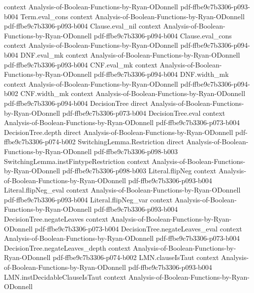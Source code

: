 \begin{lemma}
  {context}
  {Analysis-of-Boolean-Functions-by-Ryan-ODonnell}
  {pdf-ffbe9c7b3306-p093-b004}
\proofstep
  {Term.eval_cons}
  {context}
  {Analysis-of-Boolean-Functions-by-Ryan-ODonnell}
  {pdf-ffbe9c7b3306-p093-b004}
\proofstep
  {Clause.eval_nil}
  {context}
  {Analysis-of-Boolean-Functions-by-Ryan-ODonnell}
  {pdf-ffbe9c7b3306-p094-b004}
\proofstep
  {Clause.eval_cons}
  {context}
  {Analysis-of-Boolean-Functions-by-Ryan-ODonnell}
  {pdf-ffbe9c7b3306-p094-b004}
\proofstep
  {DNF.eval_mk}
  {context}
  {Analysis-of-Boolean-Functions-by-Ryan-ODonnell}
  {pdf-ffbe9c7b3306-p093-b004}
\proofstep
  {CNF.eval_mk}
  {context}
  {Analysis-of-Boolean-Functions-by-Ryan-ODonnell}
  {pdf-ffbe9c7b3306-p094-b004}
\proofstep
  {DNF.width_mk}
  {context}
  {Analysis-of-Boolean-Functions-by-Ryan-ODonnell}
  {pdf-ffbe9c7b3306-p094-b002}
\proofstep
  {CNF.width_mk}
  {context}
  {Analysis-of-Boolean-Functions-by-Ryan-ODonnell}
  {pdf-ffbe9c7b3306-p094-b004}
\proofstep
  {DecisionTree}
  {direct}
  {Analysis-of-Boolean-Functions-by-Ryan-ODonnell}
  {pdf-ffbe9c7b3306-p073-b004}
\proofstep
  {DecisionTree.eval}
  {context}
  {Analysis-of-Boolean-Functions-by-Ryan-ODonnell}
  {pdf-ffbe9c7b3306-p073-b004}
\proofstep
  {DecisionTree.depth}
  {direct}
  {Analysis-of-Boolean-Functions-by-Ryan-ODonnell}
  {pdf-ffbe9c7b3306-p074-b002}
\proofstep
  {SwitchingLemma.Restriction}
  {direct}
  {Analysis-of-Boolean-Functions-by-Ryan-ODonnell}
  {pdf-ffbe9c7b3306-p098-b003}
\proofstep
  {SwitchingLemma.instFintypeRestriction}
  {context}
  {Analysis-of-Boolean-Functions-by-Ryan-ODonnell}
  {pdf-ffbe9c7b3306-p098-b003}
\proofstep
  {Literal.flipNeg}
  {context}
  {Analysis-of-Boolean-Functions-by-Ryan-ODonnell}
  {pdf-ffbe9c7b3306-p093-b004}
\proofstep
  {Literal.flipNeg_eval}
  {context}
  {Analysis-of-Boolean-Functions-by-Ryan-ODonnell}
  {pdf-ffbe9c7b3306-p093-b004}
\proofstep
  {Literal.flipNeg_var}
  {context}
  {Analysis-of-Boolean-Functions-by-Ryan-ODonnell}
  {pdf-ffbe9c7b3306-p093-b004}
\proofstep
  {DecisionTree.negateLeaves}
  {context}
  {Analysis-of-Boolean-Functions-by-Ryan-ODonnell}
  {pdf-ffbe9c7b3306-p073-b004}
\proofstep
  {DecisionTree.negateLeaves_eval}
  {context}
  {Analysis-of-Boolean-Functions-by-Ryan-ODonnell}
  {pdf-ffbe9c7b3306-p073-b004}
\proofstep
  {DecisionTree.negateLeaves_depth}
  {context}
  {Analysis-of-Boolean-Functions-by-Ryan-ODonnell}
  {pdf-ffbe9c7b3306-p074-b002}
\proofstep
  {LMN.clauseIsTaut}
  {context}
  {Analysis-of-Boolean-Functions-by-Ryan-ODonnell}
  {pdf-ffbe9c7b3306-p093-b004}
\proofstep
  {LMN.instDecidableClauseIsTaut}
  {context}
  {Analysis-of-Boolean-Functions-by-Ryan-ODonnell}

\end{lemma}
